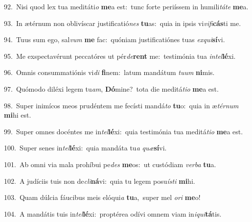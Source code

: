 {\numbfont\textcolor{\numbcolor}{92.}}~Nisi quod lex tua meditáti\textit{o} \textbf{me}\-a est:~\star tunc forte periíssem in humili\-\textit{tá}\-\textit{te} \textbf{me}\-a.\par
{\numbfont\textcolor{\numbcolor}{93.}}~In ætérnum non oblivíscar justificatió\textit{nes} \textbf{tu}\-as:~\star quia in ipsis vi\-\textit{vi}\-\textit{fi}\textbf{cás}ti me.\par
{\numbfont\textcolor{\numbcolor}{94.}}~Tuus sum ego, sal\textit{vum} \textbf{me} fac:~\star quóniam justificatiónes tuas \textit{ex}\-\textit{qui}\textbf{sí}vi.\par
{\numbfont\textcolor{\numbcolor}{95.}}~Me exspectavérunt peccatóres ut pér\-\textit{de}\-\textbf{rent} me:~\star testimónia tua \textit{in}\-\textit{tel}\textbf{lé}xi.\par
{\numbfont\textcolor{\numbcolor}{96.}}~Omnis consummatiónis vi\textit{di} \textbf{fi}\-nem:~\star latum mandátum \textit{tu}\-\textit{um} \textbf{ni}\-mis.\par
{\numbfont\textcolor{\numbcolor}{97.}}~Quómodo diléxi legem tu\-\textit{am}\-, \textbf{Dó}\-mine?~\star tota die meditá\-\textit{ti}\-\textit{o} \textbf{me}\-a est.\par
{\numbfont\textcolor{\numbcolor}{98.}}~Super inimícos meos prudéntem me fecísti mandá\textit{to} \textbf{tu}\-o:~\star quia in æ\-\textit{tér}\-\textit{num} \textbf{mi}\-hi est.\par
{\numbfont\textcolor{\numbcolor}{99.}}~Super omnes docéntes me in\-\textit{tel}\-\textbf{lé}xi:~\star quia testimónia tua meditá\-\textit{ti}\-\textit{o} \textbf{me}\-a est.\par
{\numbfont\textcolor{\numbcolor}{100.}}~Super senes in\-\textit{tel}\-\textbf{lé}xi:~\star quia mandáta tu\textit{a} \textit{quæ}\-\textbf{sí}vi.\par
{\numbfont\textcolor{\numbcolor}{101.}}~Ab omni via mala prohíbui pe\textit{des} \textbf{me}\-os:~\star ut custódiam \textit{ver}\-\textit{ba} \textbf{tu}\-a.\par
{\numbfont\textcolor{\numbcolor}{102.}}~A judíciis tuis non de\-\textit{cli}\-\textbf{ná}vi:~\star quia tu legem posu\-\textit{ís}\-\textit{ti} \textbf{mi}\-hi.\par
{\numbfont\textcolor{\numbcolor}{103.}}~Quam dúlcia fáucibus meis elóqui\textit{a} \textbf{tu}\-a,~\star super mel \textit{o}\-\textit{ri} \textbf{me}\-o!\par
{\numbfont\textcolor{\numbcolor}{104.}}~A mandátis tuis in\-\textit{tel}\-\textbf{lé}xi:~\star proptérea odívi omnem viam in\-\textit{i}\-\textit{qui}\textbf{tá}tis.\par
